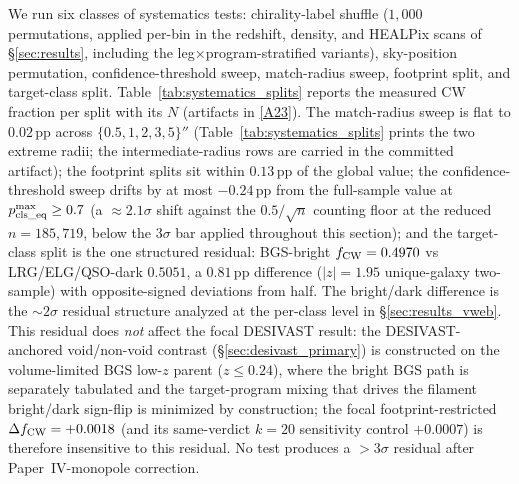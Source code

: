 \documentclass[aps,prd,twocolumn,superscriptaddress,showpacs,preprintnumbers,nofootinbib,longbibliography,floatfix]{revtex4-2}
\newcommand{\repoBase}{https://github.com/Hubify-Projects/bigbounce/blob/main}
\begin{document}
We run six classes of systematics tests:
chirality-label shuffle ($1{,}000$ permutations, applied per-bin in
the redshift, density, and HEALPix scans of
\S\ref{sec:results}, including the leg$\times$program-stratified
variants), sky-position
permutation, confidence-threshold sweep, match-radius sweep,
footprint split, and target-class split.
Table~\ref{tab:systematics_splits} reports the measured CW fraction
per split with its $N$ (artifacts in
\href{\repoBase/pipelines/p5\_desi\_chirality/results/analysis\_systematics/}{[A23]}).
The match-radius sweep is flat to $0.02$\,pp across
$\{0.5, 1, 2, 3, 5\}''$
(Table~\ref{tab:systematics_splits} prints the two extreme radii;
the intermediate-radius rows are carried in the committed artifact);
the footprint splits sit within $0.13$\,pp
of the global value; the confidence-threshold sweep drifts by at most
$-0.24$\,pp from the full-sample value at
$p_{\rm cls\_eq}^{\max} \ge 0.7$ (a ${\approx}2.1\sigma$ shift
against the $0.5/\sqrt{n}$ counting floor at the reduced
$n = 185{,}719$, below the $3\sigma$ bar applied throughout this
section); and the target-class split is the one structured
residual: BGS-bright $f_{\rm CW} = 0.4970$ vs LRG/ELG/QSO-dark
$0.5051$, a $0.81$\,pp difference ($|z| = 1.95$ unique-galaxy two-sample) with
opposite-signed deviations from half. The bright/dark
difference is the $\sim\!2\sigma$ residual structure analyzed at the
per-class level in \S\ref{sec:results_vweb}. This residual does
\emph{not} affect the focal DESIVAST result: the DESIVAST-anchored
void/non-void contrast (\S\ref{sec:desivast_primary}) is constructed
on the volume-limited BGS low-$z$ parent ($z \leq 0.24$), where the
bright BGS path is separately tabulated and the target-program mixing
that drives the filament bright/dark sign-flip is minimized by
construction; the focal footprint-restricted
$\Delta f_{\rm CW} = +0.0018$ (and its same-verdict $k\!=\!20$
sensitivity control $+0.0007$) is therefore
insensitive to this residual. No test produces a
$>3\sigma$ residual after
Paper~IV-monopole correction.
\end{document}

